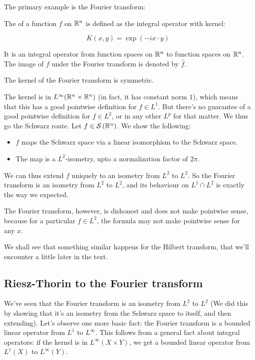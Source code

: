 \documentclass[a4paper]{amsart}
\newcommand{\schwarz}[1]{\mathcal{S}\left(#1\right)}
\begin{document}
The primary example is the Fourier transform:

\begin{definer}
  The  of a function $f$ on $\mathbb{R}^n$
  is defined as the integral operator with kernel:

  $$K(x,y) = \exp{(-ix\cdot y)}$$

  It is an integral operator from function spaces on $\mathbb{R}^n$ to
  function spaces on $\mathbb{R}^n$. The image of $f$ under the Fourier
  transform is denoted by $\hat{f}$.
\end{definer}

The kernel of the Fourier transform is symmetric.

The kernel is in $L^\infty(\mathbb{R}^n \times \mathbb{R}^n)$ (in fact, it has
constant norm $1$), which means that this has a good pointwise
definition for $f \in L^1$. But there's no guarantee of a good
pointwise definition for $f \in L^2$, or in any other $L^p$ for that
matter. We thus go the Schwarz route. Let $f \in \schwarz{\R^n}$. We
show the following:

\begin{itemize}

\item $f$ maps the Schwarz space via a linear isomorphism to the
  Schwarz space.

\item The map is a $L^2$-isometry, upto a normalization factor of
  $2\pi$.

\end{itemize}

We can thus extend $f$ uniquely to an isometry from $L^2$ to $L^2$. So
the Fourier transform is an isometry from $L^2$ to $L^2$, and its
behaviour on $L^1 \cap L^2$ is exactly the way we expected.

The Fourier transform, however, is dishonest and does not make
pointwise sense, because for a particular $f \in L^2$, the formula may
not make pointwise sense for any $x$.

We shall see that something similar happens for the Hilbert transform,
that we'll encounter a little later in the text.

\subsection{Riesz-Thorin to the Fourier transform}

We've seen that the Fourier transform is an isometry from $L^2$ to
$L^2$ (We did this by showing that it's an isometry from the Schwarz
space to itself, and then extending). Let's observe one more basic
fact: the Fourier transform is a bounded linear operator from $L^1$ to
$L^\infty$. This follows from a general fact about integral operators:
if the kernel is in $L^\infty(X \times Y)$, we get a bounded linear
operator from $L^1(X)$ to $L^\infty(Y)$.
\end{document}
